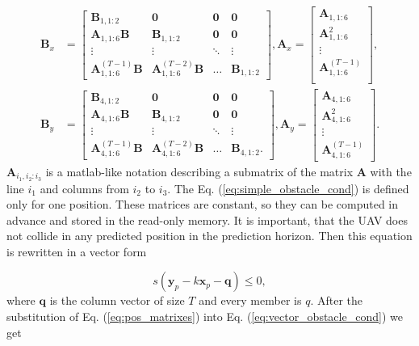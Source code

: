 \documentclass[a4paper,11pt,titlepage]{article}
\begin{document}
\begin{equation}
\begin{split}
\textbf{B}_x &= 
\begin{bmatrix}
\textbf{B}_{1, 1:2} & \textbf{0} & \textbf{0} & \textbf{0} \\
\textbf{A}_{1, 1:6}\textbf{B} & \textbf{B}_{1, 1:2} & \textbf{0} & \textbf{0} \\
\vdots & \vdots & \ddots & \vdots \\
\textbf{A}^{(T-1)}_{1, 1:6}\textbf{B} & \textbf{A}^{(T-2)}_{1, 1:6}\textbf{B} & \hdots & \textbf{B}_{1, 1:2}
\end{bmatrix}, 
\textbf{A}_x = 
\begin{bmatrix}
\textbf{A}_{1, 1:6} \\
\textbf{A}^2_{1, 1:6} \\
\vdots \\
\textbf{A}^{(T-1)}_{1, 1:6} \\
\end{bmatrix}, \\
\textbf{B}_y &= 
\begin{bmatrix}
\textbf{B}_{4, 1:2} & \textbf{0} & \textbf{0} & \textbf{0} \\
\textbf{A}_{4, 1:6}\textbf{B} & \textbf{B}_{4, 1:2} & \textbf{0} & \textbf{0} \\
\vdots & \vdots & \ddots & \vdots \\
\textbf{A}^{(T-1)}_{4, 1:6}\textbf{B} & \textbf{A}^{(T-2)}_{4, 1:6}\textbf{B} & \hdots & \textbf{B}_{4, 1:2}.
\end{bmatrix},
\textbf{A}_y = 
\begin{bmatrix}
\textbf{A}_{4, 1:6} \\
\textbf{A}^2_{4, 1:6} \\
\vdots \\
\textbf{A}^{(T-1)}_{4, 1:6}
\end{bmatrix}.
\end{split}
\end{equation}
$\textbf{A}_{i_1, i_2:i_3}$ is a matlab-like notation describing a submatrix of the matrix $\textbf{A}$ with the line $i_1$ and columns from $i_2$ to $i_3$. The Eq. (\ref{eq:simple_obstacle_cond}) is defined only for one position. These matrices are constant, so they can be computed in advance and stored in the read-only memory. It is important, that the UAV does not collide in any predicted position in the prediction horizon. Then this equation is rewritten in a vector form

\begin{equation}
\label{eq:vector_obstacle_cond}
s(\textbf{y}_p - k\textbf{x}_p - \textbf{q}) \leq 0,
\end{equation}
where $\textbf{q}$ is the column vector of size $T$ and every member is $q$.
 After the substitution of Eq. (\ref{eq:pos_matrixes}) into Eq. (\ref{eq:vector_obstacle_cond}) we get
 
\end{document}
